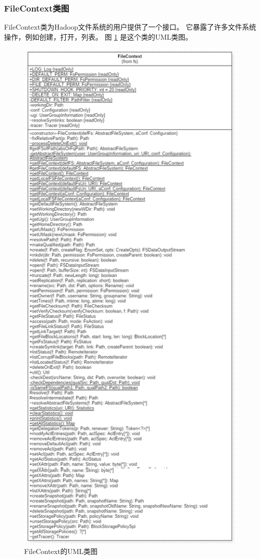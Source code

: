 \subsubsection{FileContext类图}
FileContext类为Hadoop文件系统的用户提供了一个接口。 它暴露了许多文件系统操作，例如创建，打开，列表。
图 \ref{fig:FileContext} 是这个类的UML类图。
\begin{figure}
\centering
\includegraphics[width=1\linewidth]{UML/abstractfilesystem/FileContext.PNG}
\caption{FileContext的UML类图}
\label{fig:FileContext}
\end{figure}

